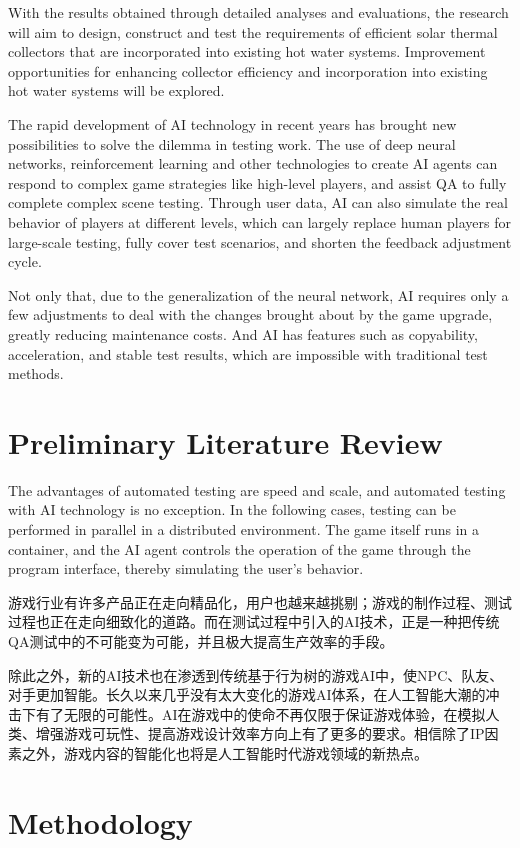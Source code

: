 \documentclass[11pt,en,authoryear]{elegantpaper}
\begin{document}
With the results obtained through detailed analyses and evaluations, the research will aim to design, construct and test the requirements of efficient solar thermal collectors that are incorporated into existing hot water systems. Improvement opportunities for enhancing collector efficiency and incorporation into existing hot water systems will be explored.


The rapid development of AI technology in recent years has brought new possibilities to solve the dilemma in testing work. The use of deep neural networks, reinforcement learning and other technologies to create AI agents can respond to complex game strategies like high-level players, and assist QA to fully complete complex scene testing.
Through user data, AI can also simulate the real behavior of players at different levels, which can largely replace human players for large-scale testing, fully cover test scenarios, and shorten the feedback adjustment cycle. 

Not only that, due to the generalization of the neural network, AI requires only a few adjustments to deal with the changes brought about by the game upgrade, greatly reducing maintenance costs. And AI has features such as copyability, acceleration, and stable test results, which are impossible with traditional test methods.

\section{Preliminary Literature Review}
The advantages of automated testing are speed and scale, and automated testing with AI technology is no exception. In the following cases, testing can be performed in parallel in a distributed environment. The game itself runs in a container, and the AI ​​agent controls the operation of the game through the program interface, thereby simulating the user's behavior.


游戏行业有许多产品正在走向精品化，用户也越来越挑剔；游戏的制作过程、测试过程也正在走向细致化的道路。而在测试过程中引入的AI技术，正是一种把传统QA测试中的不可能变为可能，并且极大提高生产效率的手段。

除此之外，新的AI技术也在渗透到传统基于行为树的游戏AI中，使NPC、队友、对手更加智能。长久以来几乎没有太大变化的游戏AI体系，在人工智能大潮的冲击下有了无限的可能性。AI在游戏中的使命不再仅限于保证游戏体验，在模拟人类、增强游戏可玩性、提高游戏设计效率方向上有了更多的要求。相信除了IP因素之外，游戏内容的智能化也将是人工智能时代游戏领域的新热点。


\section{Methodology}


\end{document}
